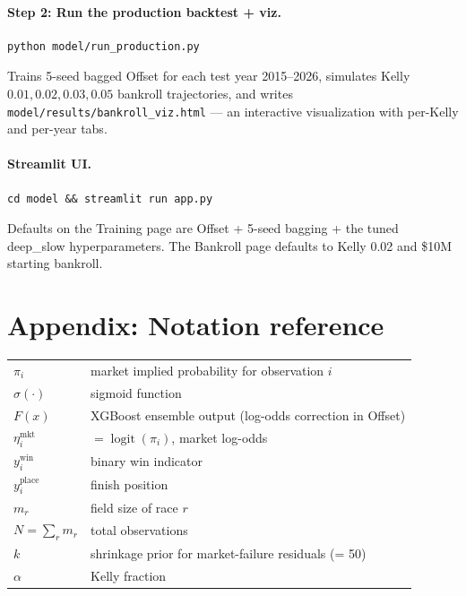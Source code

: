 \documentclass[11pt]{article}
\begin{document}
\paragraph{Step 2: Run the production backtest + viz.}
\begin{verbatim}
python model/run_production.py
\end{verbatim}
Trains 5-seed bagged Offset for each test year 2015--2026, simulates
Kelly ${0.01, 0.02, 0.03, 0.05}$ bankroll trajectories, and writes
\texttt{model/results/bankroll\_viz.html} --- an interactive
visualization with per-Kelly and per-year tabs.

\paragraph{Streamlit UI.}
\begin{verbatim}
cd model && streamlit run app.py
\end{verbatim}
Defaults on the Training page are Offset + 5-seed bagging + the tuned
deep\_slow hyperparameters. The Bankroll page defaults to Kelly 0.02
and \$10M starting bankroll.

\section*{Appendix: Notation reference}

\begin{tabular}{ll}
$\pi_i$ & market implied probability for observation $i$ \\
$\sigma(\cdot)$ & sigmoid function \\
$F(x)$ & XGBoost ensemble output (log-odds correction in Offset) \\
$\eta_i^{\text{mkt}}$ & $= \operatorname{logit}(\pi_i)$, market log-odds \\
$y_i^{\text{win}}$ & binary win indicator \\
$y_i^{\text{place}}$ & finish position \\
$m_r$ & field size of race $r$ \\
$N = \sum_r m_r$ & total observations \\
$k$ & shrinkage prior for market-failure residuals (= 50) \\
$\alpha$ & Kelly fraction \\
\end{tabular}
\end{document}
